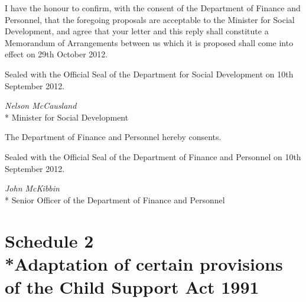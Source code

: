 \documentclass[12pt,a4paper]{article}
\begin{document}
I have the honour to confirm, with the consent of the Department of Finance and Personnel, that the foregoing proposals are acceptable to the Minister for Social Development, and agree that your letter and this reply shall constitute a Memorandum of Arrangements between us which it is proposed shall come into effect on 29th October 2012.

\bigskip

\pagebreak[3]

Sealed with the Official Seal of the Department for Social Development on 10th September 2012.

{\raggedleft
\emph{Nelson McCausland}\\*
Minister for Social Development

}

\bigskip

\pagebreak[3]

The Department of Finance and Personnel hereby consents.

Sealed with the Official Seal of the Department of Finance and Personnel on 10th September 2012.

{\raggedleft
\emph{John McKibbin}\\*
Senior Officer of the Department of Finance and Personnel

}

\vfill

\part[Schedule 2 --- Adaptation of certain provisions of the Child Support Act 1991]{Schedule 2\\*Adaptation of certain provisions of the Child Support Act 1991}

\renewcommand\parthead{--- Schedule 2}
\end{document}
